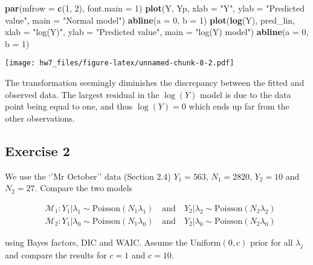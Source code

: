 \documentclass[
]{article}
\newenvironment{Shaded}{\begin{snugshade}}{\end{snugshade}}
\newcommand{\AttributeTok}[1]{\textcolor[rgb]{0.13,0.29,0.53}{#1}}
\newcommand{\DecValTok}[1]{\textcolor[rgb]{0.00,0.00,0.81}{#1}}
\newcommand{\FunctionTok}[1]{\textcolor[rgb]{0.13,0.29,0.53}{\textbf{#1}}}
\newcommand{\NormalTok}[1]{#1}
\newcommand{\StringTok}[1]{\textcolor[rgb]{0.31,0.60,0.02}{#1}}
\begin{document}
\begin{Shaded}
\begin{Highlighting}[]
\FunctionTok{par}\NormalTok{(}\AttributeTok{mfrow =} \FunctionTok{c}\NormalTok{(}\DecValTok{1}\NormalTok{, }\DecValTok{2}\NormalTok{), }\AttributeTok{font.main =} \DecValTok{1}\NormalTok{)}
\FunctionTok{plot}\NormalTok{(Y, Yp, }\AttributeTok{xlab =} \StringTok{"Y"}\NormalTok{, }\AttributeTok{ylab =} \StringTok{"Predicted value"}\NormalTok{, }\AttributeTok{main =} \StringTok{"Normal model"}\NormalTok{)}
\FunctionTok{abline}\NormalTok{(}\AttributeTok{a =} \DecValTok{0}\NormalTok{, }\AttributeTok{b =} \DecValTok{1}\NormalTok{)}
\FunctionTok{plot}\NormalTok{(}\FunctionTok{log}\NormalTok{(Y), pred\_lin, }\AttributeTok{xlab =} \StringTok{"log(Y)"}\NormalTok{, }\AttributeTok{ylab =} \StringTok{"Predicted value"}\NormalTok{, }\AttributeTok{main =} \StringTok{"log(Y) model"}\NormalTok{)}
\FunctionTok{abline}\NormalTok{(}\AttributeTok{a =} \DecValTok{0}\NormalTok{, }\AttributeTok{b =} \DecValTok{1}\NormalTok{)}
\end{Highlighting}
\end{Shaded}

\texttt{[image: hw7\_files/figure-latex/unnamed-chunk-8-2.pdf]}

The transformation seemingly diminishes the discrepancy between the
fitted and observed data. The largest residual in the \(\log(Y)\) model
is due to the data point being equal to one, and thus \(\log(Y) = 0\)
which ends up far from the other observations.

\subsection{Exercise 2}\label{exercise-2}

We use the `'Mr October'' data (Section 2.4) \(Y_1 = 563\),
\(N_1 = 2820\), \(Y_2 = 10\) and \(N_2 = 27\). Compare the two models

\[
\begin{align*}
    &\mathcal M_1: Y_1 | \lambda_1 \sim \mathrm{Poisson}(N_1\lambda_1) \quad \text{and} \quad 
     Y_2 | \lambda_2 \sim \mathrm{Poisson}(N_2\lambda_2) \\
    &\mathcal M_2: Y_1 | \lambda_0 \sim \mathrm{Poisson}(N_1\lambda_0) \quad \text{and} \quad        
     Y_2 | \lambda_0 \sim \mathrm{Poisson}(N_2\lambda_0)
\end{align*}
\]

using Bayes factors, DIC and WAIC. Assume the \(\text{Uniform}(0, c)\)
prior for all \(\lambda_j\) and compare the results for \(c = 1\) and
\(c = 10\).
\end{document}
